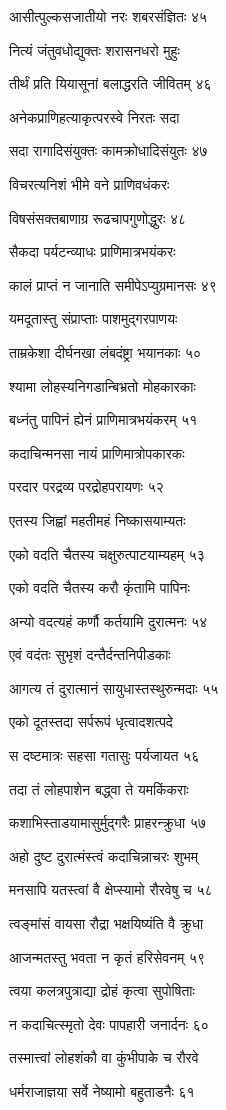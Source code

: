 आसीत्पुल्कसजातीयो नरः शबरसंज्ञितः ४५

नित्यं जंतुवधोद्युक्तः शरासनधरो मुहुः

तीर्थं प्रति यियासूनां बलाद्धरति जीवितम् ४६

अनेकप्राणिहत्याकृत्परस्वे निरतः सदा

सदा रागादिसंयुक्तः कामक्रोधादिसंयुतः ४७

विचरत्यनिशं भीमे वने प्राणिवधंकरः

विषसंसक्तबाणाग्र रूढचापगुणोद्धुरः ४८

सैकदा पर्यटन्व्याधः प्राणिमात्रभयंकरः

कालं प्राप्तं न जानाति समीपेऽप्युग्रमानसः ४९

यमदूतास्तु संप्राप्ताः पाशमुद्गरपाणयः

ताम्रकेशा दीर्घनखा लंबदंष्ट्रा भयानकाः ५०

श्यामा लोहस्यनिगडान्बिभ्रतो मोहकारकाः

बध्नंतु पापिनं ह्येनं प्राणिमात्रभयंकरम् ५१

कदाचिन्मनसा नायं प्राणिमात्रोपकारकः

परदार परद्रव्य परद्रोहपरायणः ५२

एतस्य जिह्वां महतीमहं निष्कासयाम्यतः

एको वदति चैतस्य चक्षुरुत्पाटयाम्यहम् ५३

एको वदति चैतस्य करौ कृंतामि पापिनः

अन्यो वदत्यहं कर्णौ कर्तयामि दुरात्मनः ५४

एवं वदंतः सुभृशं दन्तैर्दन्तनिपीडकाः

आगत्य तं दुरात्मानं सायुधास्तस्थुरुन्मदाः ५५

एको दूतस्तदा सर्परूपं धृत्वादशत्पदे

स दष्टमात्रः सहसा गतासुः पर्यजायत ५६

तदा तं लोहपाशेन बद्ध्वा ते यमकिंकराः

कशाभिस्ताडयामासुर्मुद्गरैः प्राहरन्क्रुधा ५७

अहो दुष्ट दुरात्मंस्त्वं कदाचिन्नाचरः शुभम्

मनसापि यतस्त्वां वै क्षेप्स्यामो रौरवेषु च ५८

त्वङ्मांसं वायसा रौद्रा भक्षयिष्यंति वै क्रुधा

आजन्मतस्तु भवता न कृतं हरिसेवनम् ५९

त्वया कलत्रपुत्राद्या द्रोहं कृत्वा सुपोषिताः

न कदाचित्स्मृतो देवः पापहारी जनार्दनः ६०

तस्मात्त्वां लोहशंकौ वा कुंभीपाके च रौरवे

धर्मराजाज्ञया सर्वे नेष्यामो बहुताडनैः ६१

